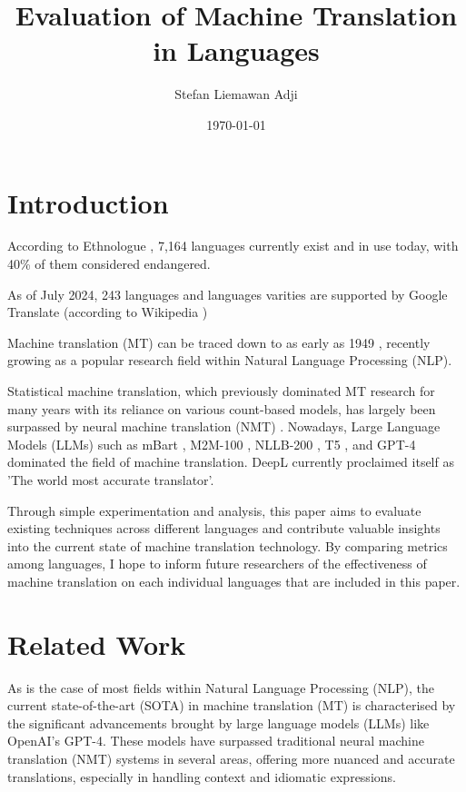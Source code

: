 \documentclass[a4paper]{article}
\title{Evaluation of Machine Translation in Languages}
\author{Stefan Liemawan Adji}
\date{\today}
\begin{document}
\maketitle

\section{Introduction}


According to Ethnologue \cite{ethnologue-2024}, 7,164 languages currently exist and in use today, with 40\% of them considered endangered.

As of July 2024, 243 languages and languages varities are supported by Google Translate (according to Wikipedia \cite{wikipedia-google-translate})

Machine translation (MT) can be traced down to as early as 1949 \cite{weaver-1999}, recently growing as a popular research field within Natural Language Processing (NLP).

Statistical machine translation, which previously dominated MT research for many years with its reliance on various count-based models, has largely been surpassed by neural machine translation (NMT) \cite{stahlberg-2020-nmt-review}. Nowadays, Large Language Models (LLMs) such as mBart \cite{liu-2020-mbart}, M2M-100 \cite{fan-2020-m2m100}, NLLB-200 \cite{nllb200}, T5 \cite{raffel-2023-t5}, and GPT-4 \cite{openai-2024-gpt4-technical-report} dominated the field of machine translation. DeepL \cite{deepl} currently proclaimed itself as 'The world most accurate translator'.

Through simple experimentation and analysis, this paper aims to evaluate existing techniques across different languages
and contribute valuable insights into the current state of machine translation technology. By comparing metrics among languages, I hope to inform future researchers of the effectiveness of machine translation on each individual languages that are included in this paper.

\section{Related Work}

As is the case of most fields within Natural Language Processing (NLP), the current state-of-the-art (SOTA) in machine translation (MT) is characterised by the significant advancements brought by large language models (LLMs) like OpenAI's GPT-4. These models have surpassed traditional neural machine translation (NMT) systems in several areas, offering more nuanced and accurate translations, especially in handling context and idiomatic expressions.
\end{document}
